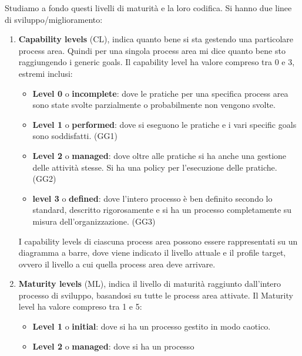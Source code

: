Studiamo a fondo questi livelli di maturità e la loro codifica. Si hanno due
linee di sviluppo/miglioramento:
\begin{enumerate}
      \item \textbf{Capability levels} (CL), indica quanto bene si sta gestendo
            una particolare process area. Quindi per una singola process area mi
            dice quanto bene sto raggiungendo i generic goals. Il capability level
            ha valore compreso tra 0 e 3, estremi inclusi:
            \begin{itemize}
                  \item \textbf{Level 0} o \textbf{incomplete}: dove le pratiche
                        per una specifica process area sono state svolte parzialmente
                        o probabilmente non vengono svolte.
                  \item \textbf{Level 1} o \textbf{performed}: dove si eseguono
                        le pratiche e i vari specific goals sono soddisfatti. (GG1)
                  \item \textbf{Level 2} o \textbf{managed}: dove oltre alle pratiche
                        si ha anche una gestione delle attività stesse. Si ha una
                        policy per l'esecuzione delle pratiche. (GG2)
                  \item \textbf{level 3} o \textbf{defined}: dove l'intero processo
                        è ben definito secondo lo standard, descritto rigorosamente
                        e si ha un processo completamente su misura dell'organizzazione.
                        (GG3)
            \end{itemize}
            I capability levels di ciascuna process area possono essere rappresentati su
            un diagramma a barre, dove viene indicato il livello attuale e il profile
            target, ovvero il livello a cui quella process area deve arrivare.
      \item \textbf{Maturity levels} (ML), indica il livello di maturità raggiunto
            dall'intero processo di sviluppo, basandosi su tutte le process area
            attivate. Il Maturity level ha valore compreso tra 1 e 5:
            \begin{itemize}
                  \item \textbf{Level 1} o \textbf{initial}: dove si ha un processo
                        gestito in modo caotico.
                  \item \textbf{Level 2} o \textbf{managed}: dove si ha un processo

\end{itemize}
\end{enumerate}
